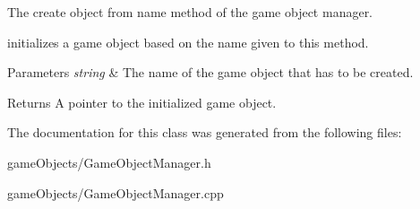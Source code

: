 The create object from name method of the game object manager. 

initializes a game object based on the name given to this method. 
\begin{DoxyParams}{Parameters}
{\em string} & The name of the game object that has to be created. \\
\hline
\end{DoxyParams}
\begin{DoxyReturn}{Returns}
A pointer to the initialized game object. 
\end{DoxyReturn}


The documentation for this class was generated from the following files\+:\begin{DoxyCompactItemize}
\item 
game\+Objects/Game\+Object\+Manager.\+h\item 
game\+Objects/Game\+Object\+Manager.\+cpp\end{DoxyCompactItemize}
